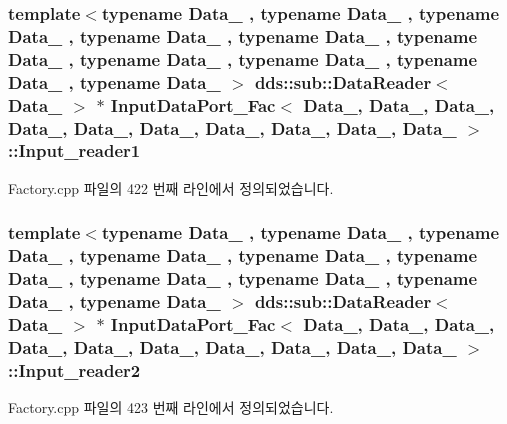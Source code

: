 \subsubsection[{\texorpdfstring{Input\+\_\+reader1}{Input_reader1}}]{\setlength{\rightskip}{0pt plus 5cm}template$<$typename Data\+\_ , typename Data\+\_ , typename Data\+\_ , typename Data\+\_ , typename Data\+\_ , typename Data\+\_ , typename Data\+\_ , typename Data\+\_ , typename Data\+\_ , typename Data\+\_ $>$ dds\+::sub\+::\+Data\+Reader$<$ Data\+\_ $>$ $\ast$ {\bf Input\+Data\+Port\+\_\+\+Fac}$<$ Data\+\_, Data\+\_, Data\+\_, Data\+\_, Data\+\_, Data\+\_, Data\+\_, Data\+\_, Data\+\_, Data\+\_ $>$\+::Input\+\_\+reader1}\hypertarget{classInputDataPort__Fac_a792017ee994f74bb649bd673ab7fb02a}{}\label{classInputDataPort__Fac_a792017ee994f74bb649bd673ab7fb02a}


Factory.\+cpp 파일의 422 번째 라인에서 정의되었습니다.

\subsubsection[{\texorpdfstring{Input\+\_\+reader2}{Input_reader2}}]{\setlength{\rightskip}{0pt plus 5cm}template$<$typename Data\+\_ , typename Data\+\_ , typename Data\+\_ , typename Data\+\_ , typename Data\+\_ , typename Data\+\_ , typename Data\+\_ , typename Data\+\_ , typename Data\+\_ , typename Data\+\_ $>$ dds\+::sub\+::\+Data\+Reader$<$ Data\+\_ $>$ $\ast$ {\bf Input\+Data\+Port\+\_\+\+Fac}$<$ Data\+\_, Data\+\_, Data\+\_, Data\+\_, Data\+\_, Data\+\_, Data\+\_, Data\+\_, Data\+\_, Data\+\_ $>$\+::Input\+\_\+reader2}\hypertarget{classInputDataPort__Fac_a4a0fff757eea71f4c9d28909442d71ac}{}\label{classInputDataPort__Fac_a4a0fff757eea71f4c9d28909442d71ac}


Factory.\+cpp 파일의 423 번째 라인에서 정의되었습니다.

